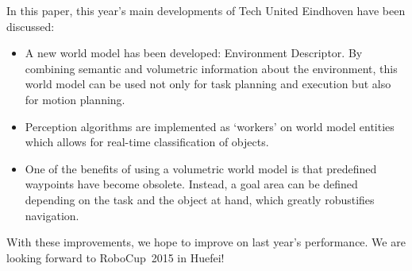 In this paper, this year's main developments of Tech United Eindhoven have been discussed:
\begin{itemize}
	\item A new world model has been developed: Environment Descriptor. By combining semantic and volumetric information about the environment, this world model can be used not only for task planning and execution but also for motion planning.
	\item Perception algorithms are implemented as `workers' on world model entities which allows for real-time classification of objects.
	\item One of the benefits of using a volumetric world model is that predefined waypoints have become obsolete. Instead, a goal area can be defined depending on the task and the object at hand, which greatly robustifies navigation.
\end{itemize}
With these improvements, we hope to improve on last year's performance. We are looking forward to RoboCup~2015 in Huefei! 